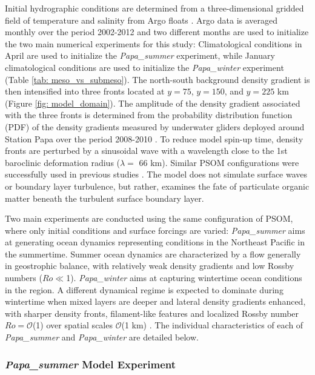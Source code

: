 \documentclass[article,linenumbers]{agujournal2019}
\begin{document}
	Initial hydrographic conditions are determined from a three-dimensional gridded field of temperature and salinity from Argo floats \cite{Gaillard_2015,Gaillard_2016}. Argo data is averaged monthly over the period 2002-2012 and two different months are used to initialize the two main numerical experiments for this study: Climatological conditions in April are used to initialize the \textit{Papa\_summer} experiment, while January climatological conditions are used to initialize the \textit{Papa\_winter} experiment (Table \ref{tab: meso_vs_submeso}). The north-south background density gradient is then intensified into three fronts located at $y = 75$, $y = 150$, and $y = 225$ km (Figure \ref{fig: model_domain}). The amplitude of the density gradient associated with the three fronts is determined from the probability distribution function (PDF) of the density gradients measured by underwater gliders deployed around Station Papa over the period 2008-2010 \cite{Pelland_2016,Pelland_2018_data}. To reduce model spin-up time, density fronts are perturbed by a sinusoidal wave with a wavelength close to the 1st baroclinic deformation radius ($\lambda = $ 66 km). Similar PSOM configurations were successfully used in previous studies \cite{Mahadevan_2012,Omand_2015}. The model does not simulate surface waves or boundary layer turbulence, but rather, examines the fate of particulate organic matter beneath the turbulent surface boundary layer.

	Two main experiments are conducted using the same configuration of PSOM, where only initial conditions and surface forcings are varied: \textit{Papa\_summer} aims at generating ocean dynamics representing conditions in the Northeast Pacific in the summertime. Summer ocean dynamics are characterized by a flow generally in geostrophic balance, with relatively weak density gradients and low Rossby numbers ($Ro\ll$1). \textit{Papa\_winter} aims at capturing wintertime ocean conditions in the region. A different dynamical regime is expected to dominate during wintertime when mixed layers are deeper and lateral density gradients enhanced, with sharper density fronts, filament-like features and localized Rossby number $Ro=\mathcal{O}$(1) over spatial scales $\mathcal{O}$(1 km) \cite{Mensa_2013,Callies_2015,Thompson_2016}. The individual characteristics of each of \textit{Papa\_summer} and \textit{Papa\_winter} are detailed below.

	\subsubsection{\textit{Papa\_summer} Model Experiment}
\end{document}
